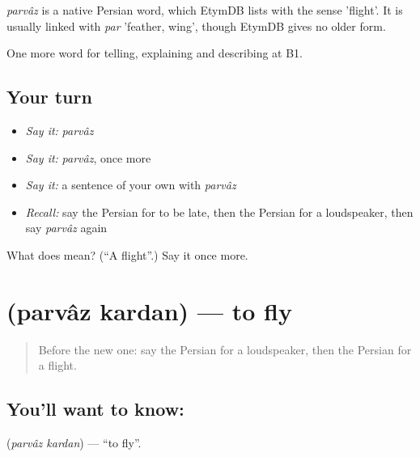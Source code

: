 \begin{cousinweb}
\emph{parvâz} is a native Persian word, which EtymDB lists with the sense 'flight'. It is usually linked with \emph{par} 'feather, wing', though EtymDB gives no older form.
\end{cousinweb}

\begin{grammarlens}[title={What you've built}]
One more word for telling, explaining and describing at B1.
\end{grammarlens}

\subsection*{Your turn}
\begin{itemize}
\raggedright
  \item \emph{Say it:} \emph{parvâz}
  \item \emph{Say it:} \emph{parvâz}, once more
  \item \emph{Say it:} a sentence of your own with \emph{parvâz}
  \item \emph{Recall:} say the Persian for to be late, then the Persian for a loudspeaker, then say \emph{parvâz} again
\end{itemize}

\begin{tcolorbox}[breakable,colback=teal!4,colframe=teal!35!black,title={Before you move on}]
What does  mean? (\textquotedblleft{}A flight\textquotedblright{}.) Say it once more.
\end{tcolorbox}
\section[\texorpdfstring{\fa{پرواز} \fa{کردن} (parvâz kardan)}{پرواز کردن (parvâz kardan)}]{  (parvâz kardan) — to fly}

\label{lesson:FA-C431-parvaz-kardan}



\begin{quote}
Before the new one: say the Persian for a loudspeaker, then the Persian for a flight.
\end{quote}

\subsection*{You'll want to know:  }
\textbf{ } (\emph{parvâz kardan}) — \textquotedblleft{}to fly\textquotedblright{}.

